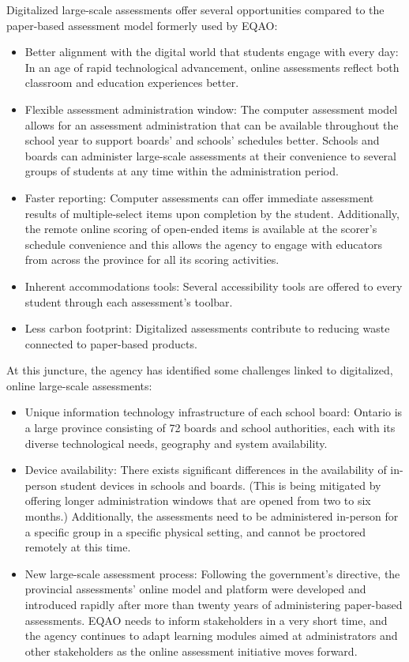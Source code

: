 \documentclass[
]{book}
\begin{document}
Digitalized large-scale assessments offer several opportunities compared to the paper-based assessment model formerly used by EQAO:

\begin{itemize}
\item
  Better alignment with the digital world that students engage with every day: In an age of rapid technological advancement, online assessments reflect both classroom and education experiences better.
\item
  Flexible assessment administration window: The computer assessment model allows for an assessment administration that can be available throughout the school year to support boards' and schools' schedules better. Schools and boards can administer large-scale assessments at their convenience to several groups of students at any time within the administration period.
\item
  Faster reporting: Computer assessments can offer immediate assessment results of multiple-select items upon completion by the student. Additionally, the remote online scoring of open-ended items is available at the scorer's schedule convenience and this allows the agency to engage with educators from across the province for all its scoring activities.
\item
  Inherent accommodations tools: Several accessibility tools are offered to every student through each assessment's toolbar.
\item
  Less carbon footprint: Digitalized assessments contribute to reducing waste connected to paper-based products.
\end{itemize}

At this juncture, the agency has identified some challenges linked to digitalized, online large-scale assessments:

\begin{itemize}
\item
  Unique information technology infrastructure of each school board: Ontario is a large province consisting of 72 boards and school authorities, each with its diverse technological needs, geography and system availability.
\item
  Device availability: There exists significant differences in the availability of in-person student devices in schools and boards. (This is being mitigated by offering longer administration windows that are opened from two to six months.) Additionally, the assessments need to be administered in-person for a specific group in a specific physical setting, and cannot be proctored remotely at this time.
\item
  New large-scale assessment process: Following the government's directive, the provincial assessments' online model and platform were developed and introduced rapidly after more than twenty years of administering paper-based assessments. EQAO needs to inform stakeholders in a very short time, and the agency continues to adapt learning modules aimed at administrators and other stakeholders as the online assessment initiative moves forward.
\end{itemize}
\end{document}
